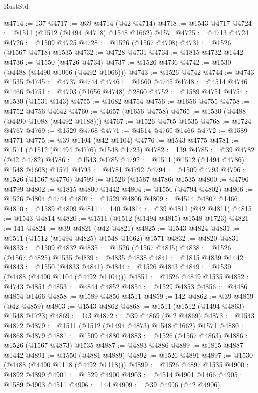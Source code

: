 \begin{lexlean}{RustStd}
\begin{coremodule}
{\begin{coremodule}
{{{{{{{{{{{{{{{{{{{{{{{{{{{{{{{{{{{@4714 := 137
@4717 := @39 @4714 (@42 @4714)
@4718 := @1543 @4717
@4724 := @1511 (@1512 (@1494 @4718) @1548 @1662) @1571
@4725 := @4713 @4724
@4726 := @1509 @4725
@4728 := @1526 (@1567 @4708)
@4731 := @1526 (@1567 @4718) @1535
@4732 := @4728 @4731
@4734 := @1815 @4732 @1442
@4736 := @1550 (@4726 @4734)
@4737 := @1526 @4736
@4742 := @1530 (@4488 (@4490 @1066 (@4492 @1066)))
@4743 := @1526 @4742
@4744 := @4743 @1535
@4745 := @4737 @4744
@4746 := @1660 @4745
@4748 := @4514 @4746 @1466
@4751 := @4703 (@1656 @4748) @2860
@4752 := @1589 @4751
@4754 := @1530 (@1531 @143)
@4755 := @1682 @4754
@4756 := @1656 @4755
@4758 := @4752 @4756 @4642
@4760 := @4657 (@1656 @4758)
@4765 := @1530 (@4488 (@4490 @1088 (@4492 @1088)))
@4767 := @1526 @4765 @1535
@4768 := @1724 @4767
@4769 := @1529 @4768
@4771 := @4514 @4769 @1466
@4772 := @1589 @4771
@4775 := @39 @1104 (@42 @1104)
@4776 := @1543 @4775
@4781 := @1511 (@1512 (@1494 @4776) @1548 @1723)
@4782 := 139
@4785 := @39 @4782 (@42 @4782)
@4786 := @1543 @4785
@4792 := @1511 (@1512 (@1494 @4786) @1548 @1608) @1571
@4793 := @4781 @4792
@4794 := @1509 @4793
@4796 := @1526 (@1567 @4776)
@4799 := @1526 (@1567 @4786) @1535
@4800 := @4796 @4799
@4802 := @1815 @4800 @1442
@4804 := @1550 (@4794 @4802)
@4806 := @1526 @4804 @4744
@4807 := @1529 @4806
@4809 := @4514 @4807 @1466
@4810 := @1589 @4809
@4811 := 140
@4814 := @39 @4811 (@42 @4811)
@4815 := @1543 @4814
@4820 := @1511 (@1512 (@1494 @4815) @1548 @1723)
@4821 := 141
@4824 := @39 @4821 (@42 @4821)
@4825 := @1543 @4824
@4831 := @1511 (@1512 (@1494 @4825) @1548 @1662) @1571
@4832 := @4820 @4831
@4833 := @1509 @4832
@4835 := @1526 (@1567 @4815)
@4838 := @1526 (@1567 @4825) @1535
@4839 := @4835 @4838
@4841 := @1815 @4839 @1442
@4843 := @1550 (@4833 @4841)
@4844 := @1526 @4843
@4849 := @1530 (@4488 (@4490 @1104 (@4492 @1104)))
@4851 := @1526 @4849 @1535
@4852 := @4743 @4851
@4853 := @4844 @4852
@4854 := @1529 @4853
@4856 := @4486 @4854 @1466
@4858 := @1589 @4856 @4511
@4859 := 142
@4862 := @39 @4859 (@42 @4859)
@4863 := @1543 @4862
@4868 := @1511 (@1512 (@1494 @4863) @1548 @1723)
@4869 := 143
@4872 := @39 @4869 (@42 @4869)
@4873 := @1543 @4872
@4879 := @1511 (@1512 (@1494 @4873) @1548 @1662) @1571
@4880 := @4868 @4879
@4881 := @1509 @4880
@4883 := @1526 (@1567 @4863)
@4886 := @1526 (@1567 @4873) @1535
@4887 := @4883 @4886
@4889 := @1815 @4887 @1442
@4891 := @1550 (@4881 @4889)
@4892 := @1526 @4891
@4897 := @1530 (@4488 (@4490 @1118 (@4492 @1118)))
@4899 := @1526 @4897 @1535
@4900 := @4892 @4899
@4901 := @1529 @4900
@4903 := @4514 @4901 @1466
@4905 := @1589 @4903 @4511
@4906 := 144
@4909 := @39 @4906 (@42 @4906)
}}}}}}}}}}}}}}}}}}}}}}}}}}}}}}}}}}}
\end{coremodule}}
\end{coremodule}
\end{lexlean}
